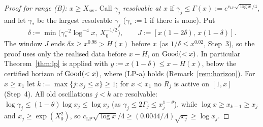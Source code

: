 \begin{proof}[Proof for range \textup{(B)}: $x\ge X_{\mathrm{sw}}$]
Call $\gamma_j$ \emph{resolvable at $x$} if $\gamma_j\le\Gamma(x):=e^{c_{\mathrm{LP}}\sqrt{\log x}/4}$, and let $\gamma_*$ be the largest
resolvable $\gamma_j$ ($\gamma_*:=1$ if there is none). Put
\[
  \delta:=\min\big(\gamma_*^{-2}\log^{-4}x,\ X_0^{-1/2}\big),\qquad J:=[x(1-2\delta),\,x(1-\delta)].
\]
The window $J$ ends $\delta x\ge x^{0.98}>H(x)$ before $x$ (as $1/\delta\le x^{0.02}$, Step~3), so the proof uses only the realised
data before $x-H$, on $\mathrm{Good}(<x)$. In particular Theorem~\ref{thm:lp} is applied with $y:=x(1-\delta)\le x-H(x)$, below the
certified horizon of $\mathrm{Good}(<x)$, where (LP-a) holds (Remark~\ref{rem:horizon}).
For $x\ge x_1$ let $k:=\max\{j:x_j\le x\}\ge1$; for $x<x_1$ no $R_j$ is active on $[1,x]$ (Step~4). All old oscillations $j<k$ are resolvable: $\log\gamma_j\le(1-\theta)\log x_j\le\log x_j$ (as
$\gamma_j\le2\Gamma_j\le x_j^{1-\theta}$), while $\log x\ge x_{k-1}\ge x_j$ and $x_j\ge\exp(X_0^2)$, so
$c_{\mathrm{LP}}\sqrt{\log x}/4\ge(0.0044/\Lambda)\sqrt{x_j}\ge\log x_j$.


\end{proof}
